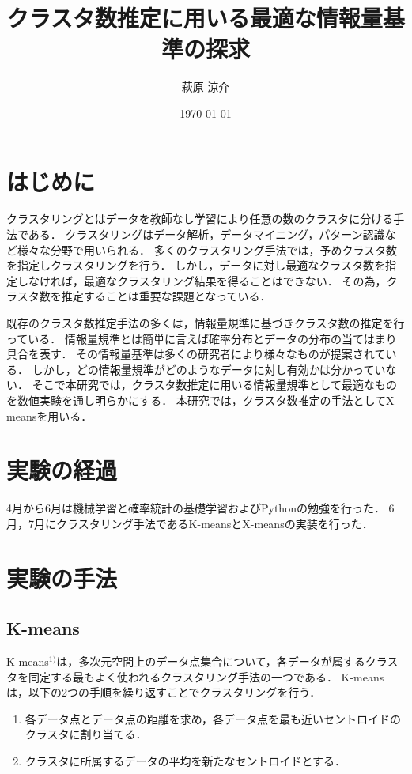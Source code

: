 \documentclass[10pt,a4j]{ltjsarticle}
\author{萩原 涼介}
\title{クラスタ数推定に用いる最適な情報量基準の探求}
\date{\today}
\affiliation{情報}
\begin{document}
\maketitle
\tableofcontents
\section{はじめに}
クラスタリングとはデータを教師なし学習により任意の数のクラスタに分ける手法である．
クラスタリングはデータ解析，データマイニング，パターン認識など様々な分野で用いられる．
多くのクラスタリング手法では，予めクラスタ数を指定しクラスタリングを行う．
しかし，データに対し最適なクラスタ数を指定しなければ，最適なクラスタリング結果を得ることはできない．
その為，クラスタ数を推定することは重要な課題となっている．

既存のクラスタ数推定手法の多くは，情報量規準に基づきクラスタ数の推定を行っている．
情報量規準とは簡単に言えば確率分布とデータの分布の当てはまり具合を表す．
その情報量基準は多くの研究者により様々なものが提案されている．
しかし，どの情報量規準がどのようなデータに対し有効かは分かっていない．
そこで本研究では，クラスタ数推定に用いる情報量規準として最適なものを数値実験を通し明らかにする．
本研究では，クラスタ数推定の手法としてX-meansを用いる．

\section{実験の経過}
4月から6月は機械学習と確率統計の基礎学習およびPythonの勉強を行った．
6月，7月にクラスタリング手法であるK-meansとX-meansの実装を行った．

\section{実験の手法}
\subsection{K-means}
K-means$^{1)}$は，多次元空間上のデータ点集合について，各データが属するクラスタを同定する最もよく使われるクラスタリング手法の一つである．
K-meansは，以下の2つの手順を繰り返すことでクラスタリングを行う．
\begin{enumerate}
  \item 各データ点とデータ点の距離を求め，各データ点を最も近いセントロイドのクラスタに割り当てる．
  \item クラスタに所属するデータの平均を新たなセントロイドとする．
\end{enumerate}
\end{document}
